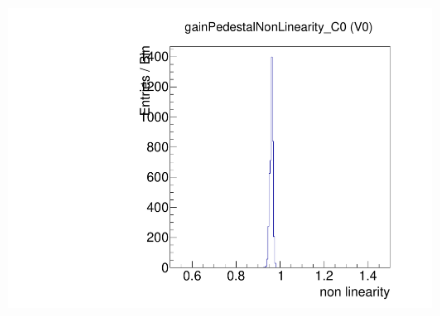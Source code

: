 \begin{figure}[!Hp]
\centering
\begin{minipage}{0.45\textwidth}
  \includegraphics[width=1.0\textwidth]{figures/gainped_gainPedestalNonLinearity.pdf}
  \caption{}
  \label{fig:gainped_gainPedestalNonLinearity}
\end{minipage}
\end{figure}
